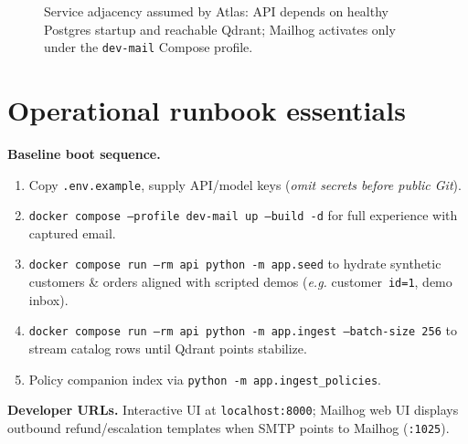 \documentclass[11pt,a4paper,twoside]{report}
\begin{document}
\begin{figure}[htbp]
\centering
{}
\caption{Service adjacency assumed by Atlas: API depends on healthy Postgres startup and reachable Qdrant; Mailhog activates only under the \texttt{dev-mail} Compose profile.}
\label{fig:compose}
\end{figure}

\section{Operational runbook essentials}
\textbf{Baseline boot sequence.}
\begin{enumerate}
\item Copy \texttt{.env.example}, supply API/model keys (\emph{omit secrets before public Git}).
\item \texttt{docker compose --profile dev-mail up --build -d} for full experience with captured email.
\item \texttt{docker compose run --rm api python -m app.seed} to hydrate synthetic customers \& orders aligned with scripted demos (\emph{e.g.} customer~\texttt{id=1}, demo inbox).
\item \texttt{docker compose run --rm api python -m app.ingest --batch-size 256} to stream catalog rows until Qdrant points stabilize.
\item Policy companion index via \texttt{python -m app.ingest_policies}.
\end{enumerate}

\textbf{Developer URLs.} Interactive UI at \texttt{localhost:8000}; Mailhog web UI displays outbound refund/escalation templates when SMTP points to Mailhog (\texttt{:1025}).
\end{document}
